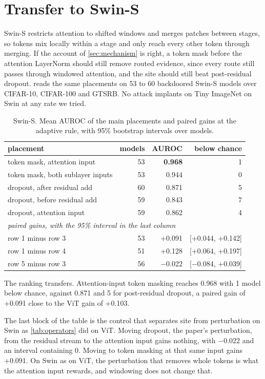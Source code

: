 \section{Transfer to Swin-S}
\label{sec:swin}

Swin-S restricts attention to shifted windows and merges patches between stages, so tokens mix locally within a stage and only reach every other token through merging. If the account of \cref{sec:mechanism} is right, a token mask before the attention LayerNorm should still remove routed evidence, since every route still passes through windowed attention, and the site should still beat post-residual dropout.  reads the same placements on 53 to 60 backdoored Swin-S models over CIFAR-10, CIFAR-100 and GTSRB. No attack implants on Tiny ImageNet on Swin at any rate we tried.

\begin{table}[t]
\centering\small
\caption{Swin-S. Mean AUROC of the main placements and paired gains at the adaptive rule, with 95\% bootstrap intervals over models.}
\label{tab:swin}
\begin{tabular}{lrrr}
\toprule
placement & models & AUROC & below chance \\
\midrule
token mask, attention input & 53 & \textbf{0.968} & 1 \\
token mask, both sublayer inputs & 53 & 0.944 & 0 \\
dropout, after residual add & 60 & 0.871 & 5 \\
dropout, before residual add & 59 & 0.843 & 7 \\
dropout, attention input & 59 & 0.862 & 4 \\
\midrule
\multicolumn{4}{l}{\emph{paired gains, with the 95\% interval in the last column}} \\
row 1 minus row 3 & 53 & +0.091 & [+0.044, +0.142] \\
row 1 minus row 4 & 51 & +0.128 & [+0.064, +0.197] \\
row 5 minus row 3 & 56 & $-$0.022 & [$-$0.084, +0.039] \\
\bottomrule
\end{tabular}
\end{table}

The ranking transfers. Attention-input token masking reaches 0.968 with 1 model below chance, against 0.871 and 5 for post-residual dropout, a paired gain of +0.091 close to the ViT gain of +0.103.

The last block of the table is the control that separates site from perturbation on Swin as \cref{tab:operators} did on ViT. Moving dropout, the paper's perturbation, from the residual stream to the attention input gains nothing, with $-$0.022 and an interval containing 0. Moving to token masking at that same input gains +0.091. On Swin as on ViT, the perturbation that removes whole tokens is what the attention input rewards, and windowing does not change that.

